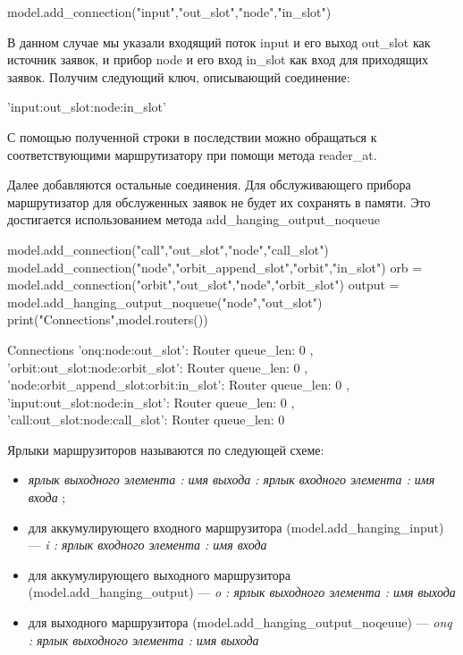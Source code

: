 \begin{pyin}
	model.add_connection("input","out_slot","node","in_slot")
\end{pyin}
В данном случае мы указали входящий поток input и его выход out\_slot как источник заявок, и прибор node и его вход in\_slot как вход для приходящих заявок. Получим следующий ключ, описывающий соединение:
\begin{pyout}
'input:out_slot:node:in_slot'
\end{pyout}
С помощью полученной строки в последствии можно обращаться к соответствующими маршрутизатору при помощи метода reader\_at.

Далее добавляются остальные соединения. Для обслуживающего прибора маршрутизатор для обслуженных заявок не будет их сохранять в памяти. Это достигается использованием метода add\_hanging\_output\_noqueue
\begin{pyin}
model.add_connection("call","out_slot","node","call_slot")
model.add_connection("node","orbit_append_slot","orbit","in_slot")
orb = model.add_connection("orbit","out_slot","node","orbit_slot")
output = model.add_hanging_output_noqueue("node","out_slot")
print("Connections",model.routers())
\end{pyin}

\begin{pyout}
Connections {
'onq:node:out_slot': Router{ queue_len: 0 },
'orbit:out_slot:node:orbit_slot': Router{ queue_len: 0 },
'node:orbit_append_slot:orbit:in_slot': Router{ queue_len: 0 },
'input:out_slot:node:in_slot': Router{ queue_len: 0 },
'call:out_slot:node:call_slot': Router{ queue_len: 0 }
}
\end{pyout}

Ярлыки маршрузиторов называются по следующей схеме:
\begin{itemize}
	\item \textit{ ярлык выходного элемента :  имя выхода :  ярлык входного элемента : имя входа };
	\item для аккумулирующего входного маршрузитора (model.add\_hanging\_input) --- \textit{i :  ярлык входного элемента : имя входа}
	\item для аккумулирующего выходного маршрузитора (model.add\_hanging\_output) --- \textit{o :  ярлык выходного элемента : имя выхода}
	\item для выходного маршрузитора (model.add\_hanging\_output\_noqeuue) --- \textit{onq :  ярлык выходного элемента : имя выхода}
\end{itemize}

